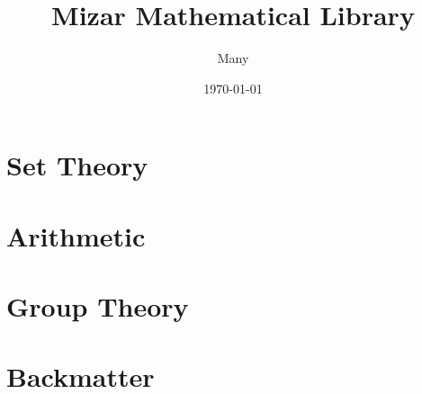 \documentclass{amsbook}
\title{Mizar Mathematical Library}
\author{Many}
\date{\today}
\begin{document}
\frontmatter
\maketitle


\tableofcontents
\mainmatter
\part{Set Theory}
\begin{papers}
  
  
  
  
  
  
  
  
  
  
  
  
  
  
  
  
  
  
  
  
  
  
  
  
  
  
  
  
  
  
  
  
  
  
  
  


\part{Arithmetic}
  
  
  
  
  
  
  
  
  
  
  
  
  
  
  
  
  
  
  
  
  
  
  

\part{Group Theory}
  
  
  
  
  
  
  
\end{papers}

\backmatter
\part{Backmatter}
\appendix


\printindex
\end{document}
